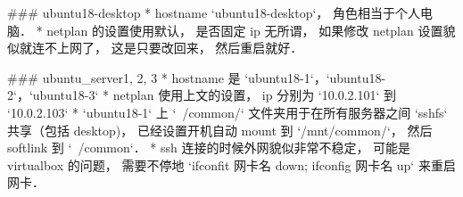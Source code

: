 ### ubuntu18-desktop
* hostname `ubuntu18-desktop`， 角色相当于个人电脑．
* netplan 的设置使用默认， 是否固定 ip 无所谓， 如果修改 netplan 设置貌似就连不上网了， 这是只要改回来， 然后重启就好．

### ubuntu_server1, 2, 3
* hostname 是 `ubuntu18-1`，`ubuntu18-2`，`ubuntu18-3`
* netplan 使用上文的设置， ip 分别为 `10.0.2.101` 到 `10.0.2.103`
* `ubuntu18-1` 上 `~/common/` 文件夹用于在所有服务器之间 `sshfs` 共享（包括 desktop)， 已经设置开机自动 mount 到 `/mnt/common/`， 然后 softlink 到 `~/common`．
* ssh 连接的时候外网貌似非常不稳定， 可能是 virtualbox 的问题， 需要不停地 `ifconfit 网卡名 down; ifconfig 网卡名 up` 来重启网卡．
